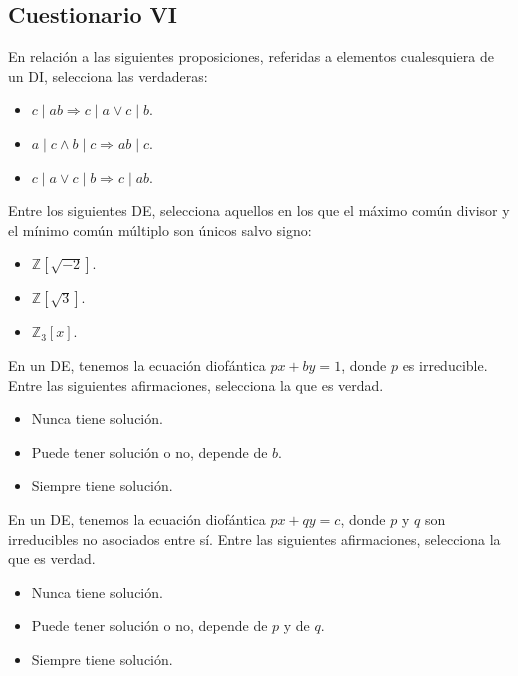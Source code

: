 \subsection{Cuestionario VI}

\begin{ejercicio}
    En relación a las siguientes proposiciones, referidas a elementos cualesquiera de un DI, selecciona las verdaderas:
    \begin{itemize}
        \item $c\mid ab \Longrightarrow c\mid a \lor c\mid b$.
        \item $a\mid c \land b\mid c \Longrightarrow ab\mid c$. 
        \item $c\mid a \lor c\mid b \Longrightarrow c\mid ab$.
    \end{itemize}
\end{ejercicio}

\begin{ejercicio}
    Entre los siguientes DE, selecciona aquellos en los que el máximo común divisor y el mínimo común múltiplo son únicos salvo signo:
    \begin{itemize}
        \item $\mathbb{Z}\left[\sqrt{-2}\right]$.
        \item $\mathbb{Z}\left[\sqrt{3}\right]$. 
        \item $\mathbb{Z}_3[x]$.
    \end{itemize}
\end{ejercicio}

\begin{ejercicio}
    En un DE, tenemos la ecuación diofántica $px+by=1$, donde $p$ es irreducible. Entre las siguientes afirmaciones, selecciona la que es verdad.
    \begin{itemize}
        \item Nunca tiene solución.
        \item Puede tener solución o no, depende de $b$. 
        \item Siempre tiene solución.
    \end{itemize}
\end{ejercicio}

\begin{ejercicio}
    En un DE, tenemos la ecuación diofántica $px+qy=c$, donde $p$ y $q$ son irreducibles no asociados entre sí. Entre las siguientes afirmaciones, selecciona la que es verdad.
    \begin{itemize}
        \item Nunca tiene solución.
        \item Puede tener solución o no, depende de $p$ y de $q$. 
        \item Siempre tiene solución.
    \end{itemize}
\end{ejercicio}

